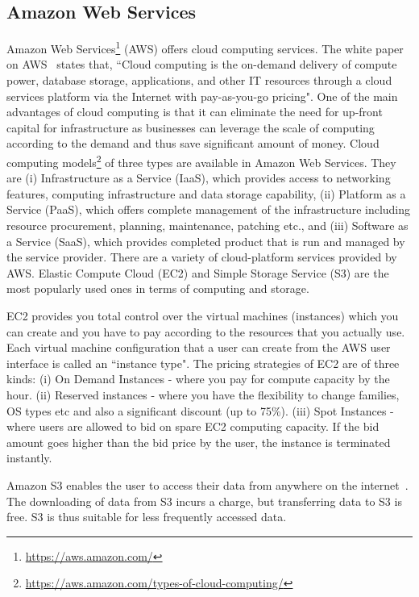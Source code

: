 \subsection{Amazon Web Services}
Amazon Web Services\footnote{\url{https://aws.amazon.com/}} (AWS) 
offers cloud computing services. The white paper on 
AWS~\cite{Amazon-Web-Services} states that, ``Cloud computing is the 
on-demand delivery of compute power, database storage, applications, 
and other IT resources through a cloud services platform via the 
Internet with pay-as-you-go pricing". One of the main advantages of 
cloud computing is that it can eliminate the need for up-front capital 
for infrastructure as businesses can leverage the scale of computing 
according to the demand and thus save significant amount of money. 
Cloud computing models\footnote{\url{https://aws.amazon.com/types-of-cloud-computing/}} 
of three types are available in Amazon Web Services. They are (i) Infrastructure as a Service (IaaS), which provides access to 
networking features, computing infrastructure and data storage 
capability, (ii) Platform as a Service (PaaS), which offers complete 
management of the infrastructure including resource procurement, 
planning, maintenance, patching etc., and (iii) Software as a Service 
(SaaS), which provides completed product that is run and managed by the 
service provider. There are a variety of cloud-platform services 
provided by AWS. Elastic Compute Cloud (EC2) and Simple Storage Service 
(S3) are the most popularly used ones in terms of computing and storage.

EC2 provides you total control over the virtual machines (instances) which you can create and you have to pay according to the resources that you actually use. Each virtual machine configuration that a user can create from the AWS user interface is called an ``instance type". The pricing strategies of EC2 are of three kinds: (i) On Demand Instances - where you pay for compute capacity by the hour. (ii) Reserved instances - where you have the flexibility to change families, OS types etc and also a significant discount (up to 75\%). (iii) Spot Instances - where users are allowed to bid on spare EC2 computing capacity. If the bid amount goes higher than the bid price by the user, the instance is terminated instantly.

Amazon S3 enables the user to access their data from anywhere on the internet~\cite{Amazon-Web-Services}. The downloading of data from S3 incurs a charge, but transferring data to S3 is free. S3 is thus suitable for less frequently accessed data.

